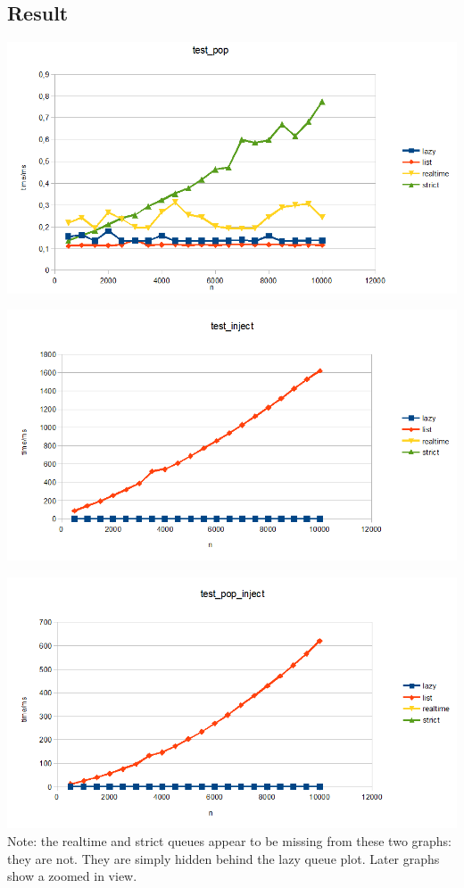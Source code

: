 \subsection{Result}
\includegraphics[scale=0.7]{Graphs/test_pop.png}


\includegraphics[scale=0.7]{Graphs/test_inject.png}


\includegraphics[scale=0.7]{Graphs/test_pop_inject.png}
Note: the realtime and strict queues appear to be missing from these two graphs: they are not. They are simply hidden behind the lazy queue plot. Later graphs show a zoomed in view.


